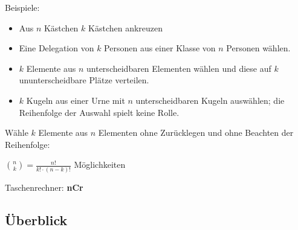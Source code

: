 \begin{multicols}{2}
Beispiele:

\begin{itemize}
\item Aus $n$ Kästchen $k$ Kästchen ankreuzen
\item Eine Delegation von $k$ Personen aus einer Klasse von $n$
Personen wählen.
\item $k$ Elemente aus $n$ unterscheidbaren Elementen wählen und diese
auf $k$ ununterscheidbare Plätze verteilen.
\item $k$ Kugeln aus einer Urne mit $n$ unterscheidbaren Kugeln
auswählen; die Reihenfolge der Auswahl spielt keine Rolle.
\end{itemize}

Wähle $k$ Elemente aus $n$ Elementen ohne Zurücklegen und ohne
Beachten der Reihenfolge:

 ${n\choose k} = \frac{n!}{k!\cdot{}(n-k)!}$ Möglichkeiten

Taschenrechner: \textbf{nCr}



\end{multicols}




\subsection*{Überblick}
\hrulefill


